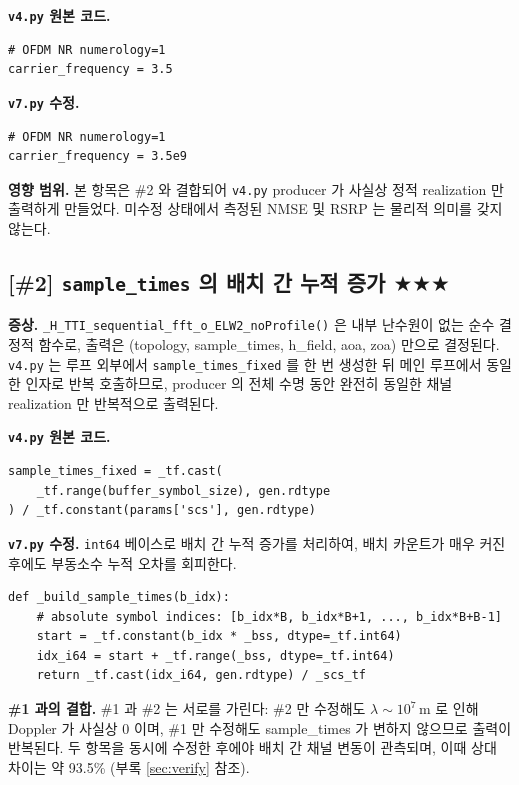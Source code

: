 \documentclass[11pt,a4paper]{article}
\newcommand{\sthree}{\textcolor{starcolor}{$\bigstar\bigstar\bigstar$}}
\newcommand{\vfour}{\texttt{v4.py}}
\newcommand{\vseven}{\texttt{v7.py}}
\newcommand{\bugitem}[3]{%
  \subsection{[\##1] #2 \hfill #3}%
  \vspace{-0.5em}%
}
\begin{document}
\textbf{\vfour{} 원본 코드.}
\begin{lstlisting}[caption={v4.py: line 194}]
# OFDM NR numerology=1
carrier_frequency = 3.5
\end{lstlisting}

\textbf{\vseven{} 수정.}
\begin{lstlisting}[caption={v7.py: line 234}]
# OFDM NR numerology=1
carrier_frequency = 3.5e9
\end{lstlisting}

\textbf{영향 범위.} 본 항목은 \#2 와 결합되어 \vfour{} producer 가 사실상
정적 realization 만 출력하게 만들었다. 미수정 상태에서 측정된 NMSE 및
RSRP 는 물리적 의미를 갖지 않는다.

\bugitem{2}{\texttt{sample\_times} 의 배치 간 누적 증가}{\sthree}

\textbf{증상.} \texttt{\_H\_TTI\_sequential\_fft\_o\_ELW2\_noProfile()}
은 내부 난수원이 없는 순수 결정적 함수로, 출력은 (topology, sample\_times,
h\_field, aoa, zoa) 만으로 결정된다. \vfour{} 는 루프 외부에서
\texttt{sample\_times\_fixed} 를 한 번 생성한 뒤 메인 루프에서 동일한
인자로 반복 호출하므로, producer 의 전체 수명 동안 완전히 동일한 채널
realization 만 반복적으로 출력된다.

\textbf{\vfour{} 원본 코드.}
\begin{lstlisting}[caption={v4.py: lines 1817--1819 (루프 외부에서 정의, 루프 내 불변)}]
sample_times_fixed = _tf.cast(
    _tf.range(buffer_symbol_size), gen.rdtype
) / _tf.constant(params['scs'], gen.rdtype)
\end{lstlisting}

\textbf{\vseven{} 수정.} \texttt{int64} 베이스로 배치 간 누적 증가를 처리하여,
배치 카운트가 매우 커진 후에도 부동소수 누적 오차를 회피한다.
\begin{lstlisting}[caption={v7.py: lines 2088--2092}]
def _build_sample_times(b_idx):
    # absolute symbol indices: [b_idx*B, b_idx*B+1, ..., b_idx*B+B-1]
    start = _tf.constant(b_idx * _bss, dtype=_tf.int64)
    idx_i64 = start + _tf.range(_bss, dtype=_tf.int64)
    return _tf.cast(idx_i64, gen.rdtype) / _scs_tf
\end{lstlisting}

\textbf{\#1 과의 결합.} \#1 과 \#2 는 서로를 가린다: \#2 만 수정해도
$\lambda \sim 10^{7}\,\text{m}$ 로 인해 Doppler 가 사실상 0 이며, \#1 만
수정해도 sample\_times 가 변하지 않으므로 출력이 반복된다. 두 항목을
동시에 수정한 후에야 배치 간 채널 변동이 관측되며, 이때 상대 차이는
약 93.5\% (부록 \ref{sec:verify} 참조).
\end{document}
